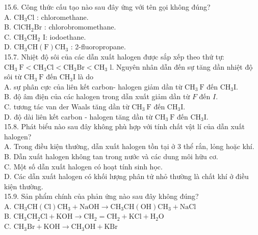\documentclass[10pt]{article}
\begin{document}
15.6. Công thức cấu tạo nào sau đây ứng với tên gọi không đúng?\\
A. $\mathrm{CH}_{3} \mathrm{Cl}$ : chloromethane.\\
B. $\mathrm{ClCH}_{2} \mathrm{Br}$ : chlorobromomethane.\\
C. $\mathrm{CH}_{3} \mathrm{CH}_{2}$ I: iodoethane.\\
D. $\mathrm{CH}_{3} \mathrm{CH}(\mathrm{F}) \mathrm{CH}_{3}$ : 2-fluoropropane.\\
15.7. Nhiệt độ sôi của các dẫn xuất halogen được sắp xếp theo thứ tự: $\mathrm{CH}_{3} \mathrm{~F}<\mathrm{CH}_{3} \mathrm{Cl}<\mathrm{CH}_{3} \mathrm{Br}<\mathrm{CH}_{3}$ l. Nguyên nhân dẫn đến sự tăng dần nhiệt độ sôi từ $\mathrm{CH}_{3} \mathrm{~F}$ đến $\mathrm{CH}_{3} \mathrm{I}$ là do\\
A. sự phân cực của liên kết carbon- halogen giảm dần từ $\mathrm{CH}_{3} \mathrm{~F}$ đến $\mathrm{CH}_{3} \mathrm{I}$.\\
B. độ âm điện của các halogen trong dẫn xuất giảm dần từ $F$ đến $I$.\\
C. tương tác van der Waals tăng dần từ $\mathrm{CH}_{3} \mathrm{~F}$ đến $\mathrm{CH}_{3} \mathrm{I}$.\\
D. độ dài liên kết carbon - halogen tăng dần từ $\mathrm{CH}_{3} \mathrm{~F}$ đến $\mathrm{CH}_{3} \mathrm{I}$.\\
15.8. Phát biểu nào sau đây không phù hợp với tính chất vật lí của dẫn xuất halogen?\\
A. Trong điều kiện thường, dẫn xuất halogen tồn tại ở 3 thể rắn, lỏng hoặc khí.\\
B. Dẫn xuất halogen không tan trong nước và các dung môi hữu cơ.\\
C. Một số dẫn xuất halogen có hoạt tính sinh học.\\
D. Các dẫn xuất halogen có khối lượng phân tử nhỏ thường là chất khí ở điều kiện thường.\\
15.9. Sản phẩm chính của phản ứng nào sau đây không đúng?\\
A. $\mathrm{CH}_{3} \mathrm{CH}(\mathrm{Cl}) \mathrm{CH}_{3}+\mathrm{NaOH} \rightarrow \mathrm{CH}_{3} \mathrm{CH}(\mathrm{OH}) \mathrm{CH}_{3}+\mathrm{NaCl}$\\
B. $\mathrm{CH}_{3} \mathrm{CH}_{2} \mathrm{Cl}+\mathrm{KOH} \rightarrow \mathrm{CH}_{2}=\mathrm{CH}_{2}+\mathrm{KCl}+\mathrm{H}_{2} \mathrm{O}$\\
C. $\mathrm{CH}_{3} \mathrm{Br}+\mathrm{KOH} \rightarrow \mathrm{CH}_{3} \mathrm{OH}+\mathrm{KBr}$\\
\end{document}
